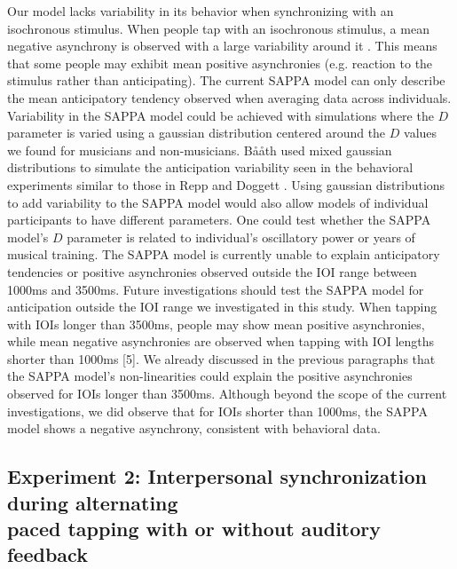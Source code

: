 \documentclass{report}
\begin{document}
Our model lacks variability in its behavior when synchronizing with an isochronous stimulus. When people tap with an isochronous stimulus, a mean negative asynchrony is observed with a large variability around it \cite{repp2005sensorimotor}. This means that some people may exhibit mean positive asynchronies (e.g. reaction to the stimulus rather than anticipating). The current SAPPA model can only describe the mean anticipatory tendency observed when averaging data across individuals. Variability in the SAPPA model could be achieved with simulations where the $D$ parameter is varied using a gaussian distribution centered around the $D$ values we found for musicians and non-musicians. B\aa\aa th \cite{baaaath2016estimating} used mixed gaussian distributions to simulate the anticipation variability seen in the behavioral experiments similar to those in Repp and Doggett \cite{repp2007tapping}. Using gaussian distributions to add variability to the SAPPA model would also allow models of individual participants to have different parameters. One could test whether the SAPPA model’s $D$ parameter is related to individual’s oscillatory power or years of musical training. The SAPPA model is currently unable to explain anticipatory tendencies or positive asynchronies observed outside the IOI range between 1000ms and 3500ms. Future investigations should test the SAPPA model for anticipation outside the IOI range we investigated in this study. When tapping with IOIs longer than 3500ms, people may show mean positive asynchronies, while mean negative asynchronies are observed when tapping with IOI lengths shorter than 1000ms [5]. We already discussed in the previous paragraphs that the SAPPA model’s non-linearities could explain the positive asynchronies observed for IOIs longer than 3500ms. Although beyond the scope of the current investigations, we did observe that for IOIs shorter than 1000ms, the SAPPA model shows a negative asynchrony, consistent with behavioral data.

\subsection{Experiment 2: Interpersonal synchronization during alternating \\ paced tapping with or without auditory feedback}
\end{document}
